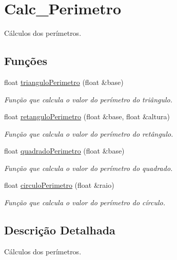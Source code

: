 \hypertarget{group__Calc__Perimetro}{}\section{Calc\+\_\+\+Perimetro}
\label{group__Calc__Perimetro}


Cálculos dos perímetros.  


\subsection*{Funções}
\begin{DoxyCompactItemize}
\item 
float \hyperlink{group__Calc__Perimetro_ga76a18caf86cad87741930b6b73a28e6d}{triangulo\+Perimetro} (float \&base)
\begin{DoxyCompactList}\small\item\em Função que calcula o valor do perímetro do triângulo. \end{DoxyCompactList}\item 
float \hyperlink{group__Calc__Perimetro_ga818dc286a8e9892293bddf8c2c4611dd}{retangulo\+Perimetro} (float \&base, float \&altura)
\begin{DoxyCompactList}\small\item\em Função que calcula o valor do perímetro do retângulo. \end{DoxyCompactList}\item 
float \hyperlink{group__Calc__Perimetro_ga262504d9854cd41bc2519504de0531ca}{quadrado\+Perimetro} (float \&base)
\begin{DoxyCompactList}\small\item\em Função que calcula o valor do perímetro do quadrado. \end{DoxyCompactList}\item 
float \hyperlink{group__Calc__Perimetro_gabf774992f344a535b77e941cabb7e2f0}{circulo\+Perimetro} (float \&raio)
\begin{DoxyCompactList}\small\item\em Função que calcula o valor do perímetro do círculo. \end{DoxyCompactList}\end{DoxyCompactItemize}


\subsection{Descrição Detalhada}
Cálculos dos perímetros. 



